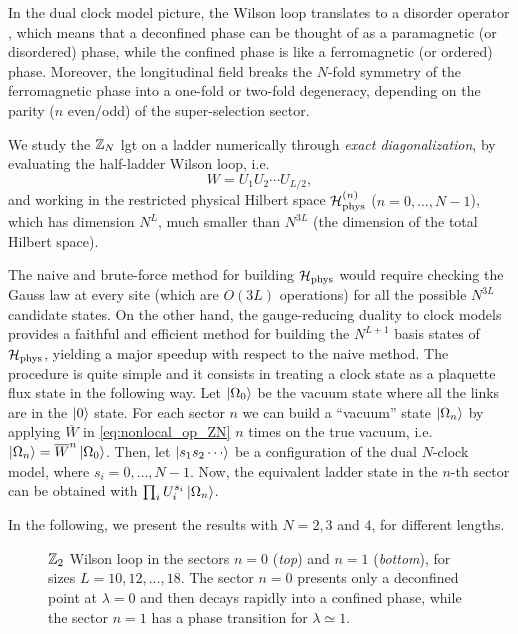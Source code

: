 In the dual clock model picture, the Wilson loop translates to a disorder operator \cite{fradkin1978order}, which means that a deconfined phase can be thought of as a paramagnetic (or disordered) phase, while the confined phase is like a ferromagnetic (or ordered) phase.
Moreover, the longitudinal field breaks the $N$-fold symmetry of the ferromagnetic phase into a one-fold or two-fold degeneracy, depending on the parity ($n$ even/odd) of the super-selection sector.

We study the $\mathbb{Z}_N$ \ac{lgt} on a ladder numerically through \emph{exact diagonalization}, by evaluating the half-ladder Wilson loop, i.e.~
\begin{equation}
    W = U_1 U_2 \cdots U_{L/2},
\end{equation}
and working in the restricted physical Hilbert space $\mathcal{H}_{\text{phys}}^{(n)}$ ($n=0,\dots,N-1$), which has dimension $N^L$, much smaller than $N^{3L}$ (the dimension of the total Hilbert space).

The naive and brute-force method for building $\mathcal{H}_{\text{phys}}$ would require checking the Gauss law at every site (which are $O(3L)$ operations) for all the possible $N^{3L}$ candidate states.
On the other hand, the gauge-reducing duality to clock models provides a faithful and efficient method for building the $N^{L+1}$ basis states of $\mathcal{H}_{\text{phys}}$, yielding a major speedup with respect to the naive method.
The procedure is quite simple and it consists in treating a clock state as a plaquette flux state in the following way.
Let $\ket{\Omega_0}$ be the vacuum state where all the links are in the $\ket{0}$ state.
For each sector $n$ we can build a ``vacuum'' state $\ket{\Omega_n}$ by applying $\overline{W}$ in \eqref{eq:nonlocal_op_ZN} $n$ times on the true vacuum, i.e.~$\ket{\Omega_n} = \overline{W}^{n} \ket{\Omega_0}$.
Then, let $\ket{s_1 s_2 \cdots}$ be a configuration of the dual $N$-clock model, where $s_i = 0, \dots, N-1$.
Now, the equivalent ladder state in the $n$-th sector can be obtained with $\prod_{i} U_i^{s_i} \ket{\Omega_n}$.

In the following, we present the results with $N=2,3$ and $4$, for different lengths.



\begin{figure}[t]
    \centering
    
    \vspace*{-10pt}
    \caption[Wilson loops for the $\Z_2$ ladder \ac{lgt}]{$\Z_2$ Wilson loop in the sectors $n=0$ (\emph{top}) and $n=1$ (\emph{bottom}), for sizes $L=10,12, \dots,18$.
    The sector $n=0$ presents only a deconfined point at $\lambda=0$ and then decays rapidly into a confined phase, while the sector $n=1$ has a phase transition for $\lambda \simeq 1$.
    }
    \label{fig:z2_wilson}
\end{figure}


